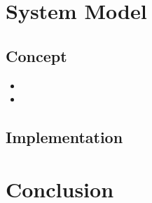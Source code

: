 \documentclass[a4paper,onecolumn]{article}
\begin{document}
\section{System Model}
\label{sec:system-model}

\subsection{Concept}
\lipsum[1]\cite{asimov1951foundation}

\begin{itemize}
	\item \lipsum[53]
	\item \lipsum[11]
\end{itemize}

\lipsum[43]

\subsection{Implementation}
\lipsum[2]

\section{Conclusion}
\label{sec:conclusion}

\lipsum[9-10]


\end{document}
